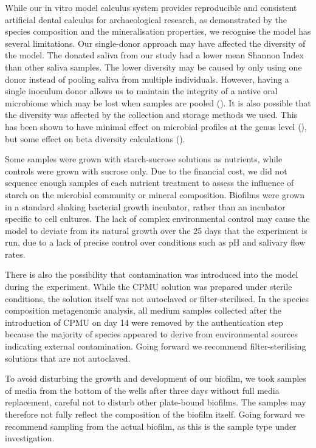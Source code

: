 \documentclass[
  b5paper,
]{book}
\begin{document}
While our in vitro model calculus system provides reproducible and
consistent artificial dental calculus for archaeological research, as
demonstrated by the species composition and the mineralisation
properties, we recognise the model has several limitations. Our
single-donor approach may have affected the diversity of the model. The
donated saliva from our study had a lower mean Shannon Index than other
saliva samples. The lower diversity may be caused by only using one
donor instead of pooling saliva from multiple individuals. However,
having a single inoculum donor allows us to maintain the integrity of a
native oral microbiome which may be lost when samples are pooled
(). It is also
possible that the diversity was affected by the collection and storage
methods we used. This has been shown to have minimal effect on microbial
profiles at the genus level (), but some effect on beta diversity calculations
().

Some samples were grown with starch-sucrose solutions as nutrients,
while controls were grown with sucrose only. Due to the financial cost,
we did not sequence enough samples of each nutrient treatment to assess
the influence of starch on the microbial community or mineral
composition. Biofilms were grown in a standard shaking bacterial growth
incubator, rather than an incubator specific to cell cultures. The lack
of complex environmental control may cause the model to deviate from its
natural growth over the 25 days that the experiment is run, due to a
lack of precise control over conditions such as pH and salivary flow
rates.

There is also the possibility that contamination was introduced into the
model during the experiment. While the CPMU solution was prepared under
sterile conditions, the solution itself was not autoclaved or
filter-sterilised. In the species composition metagenomic analysis, all
medium samples collected after the introduction of CPMU on day 14 were
removed by the authentication step because the majority of species
appeared to derive from environmental sources indicating external
contamination. Going forward we recommend filter-sterilising solutions
that are not autoclaved.

To avoid disturbing the growth and development of our biofilm, we took
samples of media from the bottom of the wells after three days without
full media replacement, careful not to disturb other plate-bound
biofilms. The samples may therefore not fully reflect the composition of
the biofilm itself. Going forward we recommend sampling from the actual
biofilm, as this is the sample type under investigation.
\end{document}
